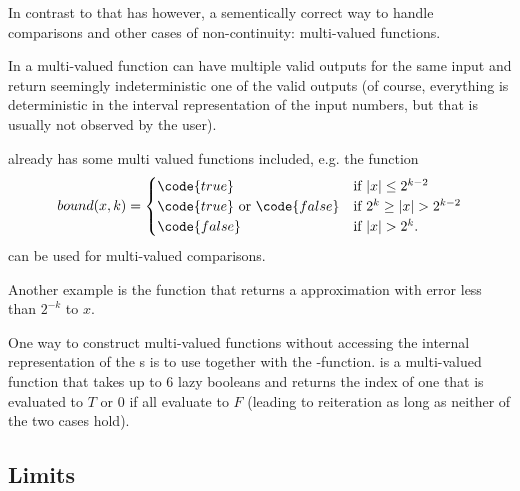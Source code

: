 		In contrast to that \irram has however, a sementically correct way to handle comparisons and other
		cases of non-continuity: multi-valued functions.

		In \irram a multi-valued function can have multiple valid outputs for the same input and 
		return seemingly indeterministic one of the valid outputs (of course, everything is deterministic in the 
		interval representation of the input numbers, but that is usually not observed by the user).
		
		\irram already has some multi valued functions included, e.g. the function
		\begin{equation*}
			bound(x,k) = 
			\begin{cases}
				\code{true} & \mbox{if } | x | \leq 2^{k-2} \\
				\code{true} \mbox{ or } \code{false} & \mbox{if } 2^k \geq |x| > 2^{k-2} \\
				 \code{false}  & \mbox{if } |x| > 2^k.
			\end{cases}
		\end{equation*}
		can be used for multi-valued comparisons.

		Another example is the function  that returns a  
		approximation with error less than $2^{-k}$ to $x$.	

		One way to construct multi-valued functions without accessing the internal representation of the {\real}s 
		is to use  together with the -function.
		 is a multi-valued function that takes up to 6 lazy booleans and returns the index of one 
		that is evaluated to $T$ or $0$ if all evaluate to $F$ (leading to reiteration as long as neither of the two cases hold).



	\subsection{Limits}

